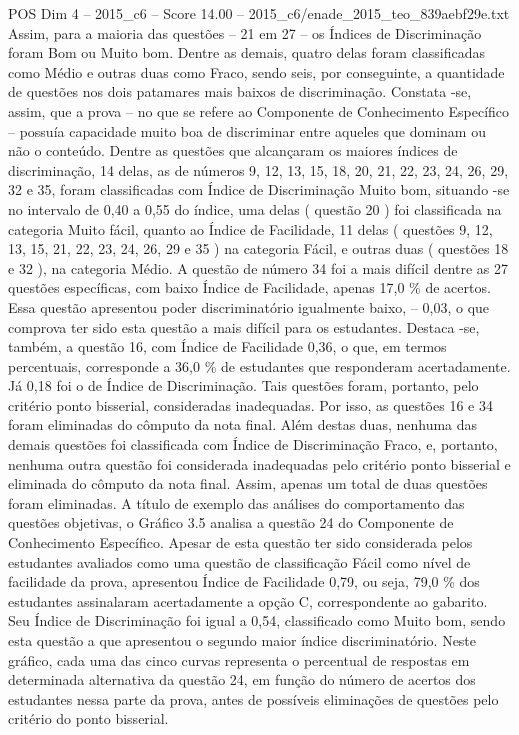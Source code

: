 \begin{textsample}{POS Dim 4 – 2015\_c6 – Score 14.00 – 2015\_c6/enade\_2015\_teo\_839aebf29e.txt}
Assim, para a maioria das questões – 21 em 27 – os Índices de Discriminação foram Bom ou Muito bom.
Dentre as demais, quatro delas foram classificadas como Médio e outras duas como Fraco, sendo seis, por conseguinte, a quantidade de questões nos dois patamares mais baixos de discriminação.
Constata -se, assim, que a prova – no que se refere ao Componente de Conhecimento Específico – possuía capacidade muito boa de discriminar entre aqueles que dominam ou não o conteúdo.
Dentre as questões que alcançaram os maiores índices de discriminação, 14 delas, as de números 9, 12, 13, 15, 18, 20, 21, 22, 23, 24, 26, 29, 32 e 35, foram classificadas com Índice de Discriminação Muito bom, situando -se no intervalo de 0,40 a 0,55 do índice, uma delas ( questão 20 ) foi classificada na categoria Muito fácil, quanto ao Índice de Facilidade, 11 delas ( questões 9, 12, 13, 15, 21, 22, 23, 24, 26, 29 e 35 ) na categoria Fácil, e outras duas ( questões 18 e 32 ), na categoria Médio.
A questão de número 34 foi a mais difícil dentre as 27 questões específicas, com baixo Índice de Facilidade, apenas 17,0 \% de acertos.
Essa questão apresentou poder discriminatório igualmente baixo, – 0,03, o que comprova ter sido esta questão a mais difícil para os estudantes.
Destaca -se, também, a questão 16, com Índice de Facilidade 0,36, o que, em termos percentuais, corresponde a 36,0 \% de estudantes que responderam acertadamente.
Já 0,18 foi o de Índice de Discriminação.
Tais questões foram, portanto, pelo critério ponto bisserial, consideradas inadequadas.
Por isso, as questões 16 e 34 foram eliminadas do cômputo da nota final.
Além destas duas, nenhuma das demais questões foi classificada com Índice de Discriminação Fraco, e, portanto, nenhuma outra questão foi considerada inadequadas pelo critério ponto bisserial e eliminada do cômputo da nota final.
Assim, apenas um total de duas questões foram eliminadas.
A título de exemplo das análises do comportamento das questões objetivas, o Gráfico 3.5 analisa a questão 24 do Componente de Conhecimento Específico.
Apesar de esta questão ter sido considerada pelos estudantes avaliados como uma questão de classificação Fácil como nível de facilidade da prova, apresentou Índice de Facilidade 0,79, ou seja, 79,0 \% dos estudantes assinalaram acertadamente a opção C, correspondente ao gabarito.
Seu Índice de Discriminação foi igual a 0,54, classificado como Muito bom, sendo esta questão a que apresentou o segundo maior índice discriminatório.
Neste gráfico, cada uma das cinco curvas representa o percentual de respostas em determinada alternativa da questão 24, em função do número de acertos dos estudantes nessa parte da prova, antes de possíveis eliminações de questões pelo critério do ponto bisserial.

\end{textsample}

